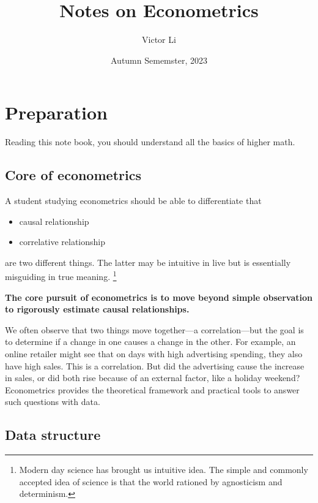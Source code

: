 \documentclass{article}
\title{Notes on Econometrics}
\author{Victor Li}
\date{Autumn Sememster, 2023}
\providecommand{\tightlist}{
  \setlength{\itemsep}{0pt}
  \setlength{\parskip}{0pt}}
\begin{document}
\maketitle

\newpage
\tableofcontents


\newpage
\section{Preparation}

Reading this note book, you should understand all the basics of higher math. 

\subsection{Core of econometrics} %
\label{sub:core_of_econometrics}

A student studying econometrics should be able to differentiate that
\begin{itemize}
\tightlist
  \item causal relationship
  \item correlative relationship
\end{itemize}
are two different things. The latter may be intuitive in live but is essentially misguiding in true meaning.
\footnote{Modern day science has brought us intuitive idea. The simple and commonly accepted idea of science is that the world rationed by agnosticism and determinism.}

\textbf{The core pursuit of econometrics is to move beyond simple observation to rigorously estimate causal relationships.} 

We often observe that two things move together—a correlation—but the goal is to determine if a change in one causes a change in the other. For example, an online retailer might see that on days with high advertising spending, they also have high sales. This is a correlation. But did the advertising cause the increase in sales, or did both rise because of an external factor, like a holiday weekend? Econometrics provides the theoretical framework and practical tools to answer such questions with data.


\subsection{Data structure} %
\label{sub:data_structure}

\end{document}
